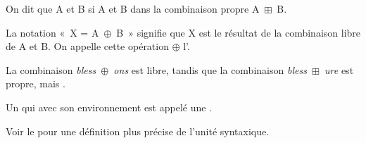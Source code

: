 {On dit que A et B  si A et B  dans la combinaison propre A~${\boxplus}$~B.}

{La notation «~X = A~${\oplus}$~B~» signifie que X est le résultat de la combinaison libre de A et B. On appelle cette opération ${\oplus}$ l’.}

La combinaison \textit{bless~}${\oplus}$\textit{~ons} est libre, tandis que la combinaison \textit{bless~}${\boxplus}$\textit{~ure} est propre, mais .

{Un  qui  avec son environnement est appelé une .}

Voir le  pour une définition plus précise de l'unité syntaxique.

